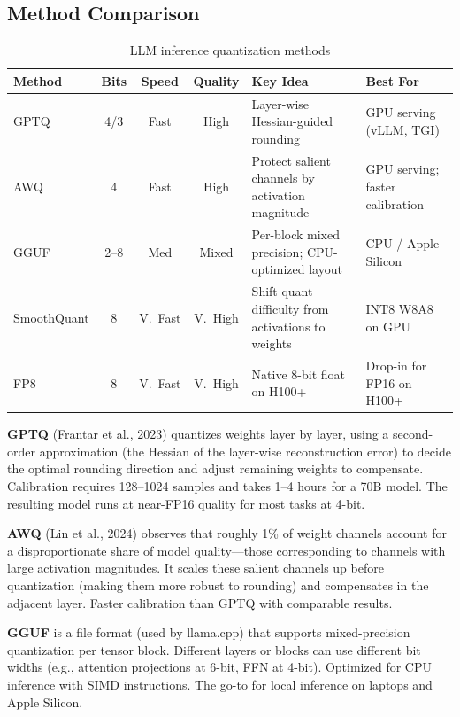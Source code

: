 \subsection{Method Comparison}

\begin{table}[H]
\centering
\caption{LLM inference quantization methods}
\begin{tabularx}{\textwidth}{lcccXX}
\toprule
\textbf{Method} & \textbf{Bits} & \textbf{Speed} & \textbf{Quality} & \textbf{Key Idea} & \textbf{Best For} \\
\midrule
GPTQ & 4/3 & Fast & High & Layer-wise Hessian-guided rounding & GPU serving (vLLM, TGI) \\
AWQ & 4 & Fast & High & Protect salient channels by activation magnitude & GPU serving; faster calibration \\
GGUF & 2--8 & Med & Mixed & Per-block mixed precision; CPU-optimized layout & CPU / Apple Silicon \\
SmoothQuant & 8 & V.\ Fast & V.\ High & Shift quant difficulty from activations to weights & INT8 W8A8 on GPU \\
FP8 & 8 & V.\ Fast & V.\ High & Native 8-bit float on H100+ & Drop-in for FP16 on H100+ \\
\bottomrule
\end{tabularx}
\end{table}

\textbf{GPTQ} (Frantar et al., 2023) quantizes weights layer by layer, using a second-order approximation (the Hessian of the layer-wise reconstruction error) to decide the optimal rounding direction and adjust remaining weights to compensate. Calibration requires 128--1024 samples and takes 1--4 hours for a 70B model. The resulting model runs at near-FP16 quality for most tasks at 4-bit.

\textbf{AWQ} (Lin et al., 2024) observes that roughly 1\% of weight channels account for a disproportionate share of model quality---those corresponding to channels with large activation magnitudes. It scales these salient channels up before quantization (making them more robust to rounding) and compensates in the adjacent layer. Faster calibration than GPTQ with comparable results.

\textbf{GGUF} is a file format (used by llama.cpp) that supports mixed-precision quantization per tensor block. Different layers or blocks can use different bit widths (e.g., attention projections at 6-bit, FFN at 4-bit). Optimized for CPU inference with SIMD instructions. The go-to for local inference on laptops and Apple Silicon.

